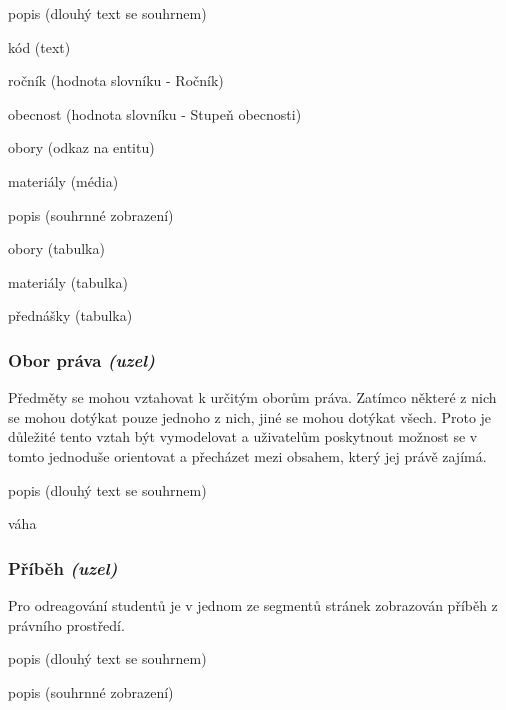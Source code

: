 \begin{list}{-}{Pole}
  \item popis (dlouhý text se souhrnem)
  \item kód (text)
  \item ročník (hodnota slovníku - Ročník) 
  \item obecnost (hodnota slovníku - Stupeň obecnosti)
  \item obory (odkaz na entitu)
  \item materiály (média)
\end{list}

\begin{list}{-}{Zobrazení}
  \item popis (souhrnné zobrazení)
  \item obory (tabulka)
  \item materiály (tabulka)
  \item přednášky (tabulka)
\end{list}

\subsubsection*{Obor práva \emph{(uzel)}}
Předměty se mohou vztahovat k určitým oborům práva. Zatímco některé z nich se mohou dotýkat pouze jednoho z nich, jiné se mohou dotýkat všech. Proto je důležité tento vztah být vymodelovat a uživatelům poskytnout možnost se v tomto jednoduše orientovat a přecházet mezi obsahem, který jej právě zajímá. \\

\begin{list}{-}{Pole}
  \item popis (dlouhý text se souhrnem)
  \item váha
\end{list}

\subsubsection*{Příběh \emph{(uzel)}}
Pro odreagování studentů je v jednom ze segmentů stránek zobrazován příběh z právního prostředí. \\

\begin{list}{-}{Pole}
  \item popis (dlouhý text se souhrnem)
\end{list}

\begin{list}{-}{Zobrazení}
  \item popis (souhrnné zobrazení)
\end{list}


